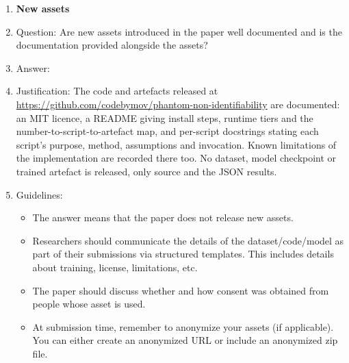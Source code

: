 \begin{enumerate}
\item {\bf New assets}
    \item[] Question: Are new assets introduced in the paper well documented and is the documentation provided alongside the assets?
    \item[] Answer: \answerYes{} %
    \item[] Justification: The code and artefacts released at \url{https://github.com/codebymov/phantom-non-identifiability} are documented: an MIT licence, a README giving install steps, runtime tiers and the number-to-script-to-artefact map, and per-script docstrings stating each script's purpose, method, assumptions and invocation. Known limitations of the implementation are recorded there too. No dataset, model checkpoint or trained artefact is released, only source and the JSON results.
    \item[] Guidelines:
    \begin{itemize}
        \item The answer \answerNA{} means that the paper does not release new assets.
        \item Researchers should communicate the details of the dataset\slash code\slash model as part of their submissions via structured templates. This includes details about training, license, limitations, etc. 
        \item The paper should discuss whether and how consent was obtained from people whose asset is used.
        \item At submission time, remember to anonymize your assets (if applicable). You can either create an anonymized URL or include an anonymized zip file.
    \end{itemize}


\end{enumerate}
